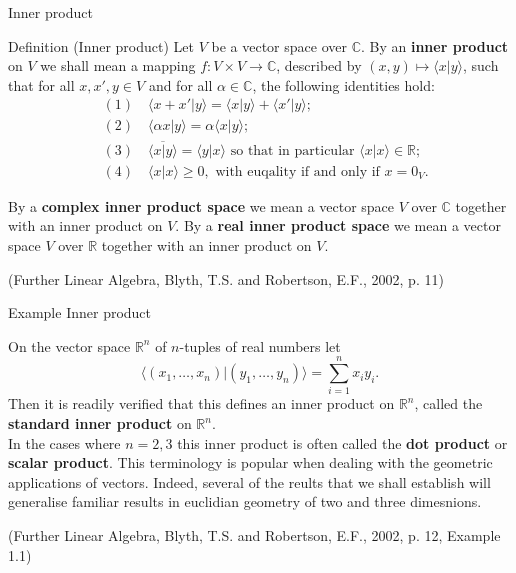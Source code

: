 \documentclass{beamer}
\begin{document}
\begin{frame}{Inner product}
    \small
    \begin{block}{Definition (Inner product)}
        Let $V$ be a vector space over $\mathbb{C}$. By an \textbf{inner product} on $V$ we shall mean a mapping $f: V \times V \to \mathbb{C}$, described by $(x,y) \mapsto \langle x | y \rangle$, such that for all $x, x', y \in V$ and for all $\alpha \in \mathbb{C}$, the following identities hold:
        \begin{align*}
            &(1) \quad \langle x + x' | y \rangle = \langle x | y \rangle + \langle x' | y \rangle;\\ 
            &(2) \quad \langle \alpha x | y \rangle = \alpha \langle x | y \rangle;\\
            &(3) \quad \overline{\langle x | y \rangle} = \langle y | x \rangle \text{ so that in particular } \langle x | x \rangle \in \mathbb{R};\\
            &(4) \quad \langle x | x \rangle \geq 0, \text{ with euqality if and only if } x = 0_V.
        \end{align*}
        
        By a \textbf{complex inner product space} we mean a vector space $V$ over $\mathbb{C}$ together with an inner product on $V$. By a \textbf{real inner product space} we mean a vector space $V$ over $\mathbb{R}$ together with an inner product on $V$.
        
        \par \vspace{3mm} (Further Linear Algebra, Blyth, T.S. and Robertson, E.F., 2002, p. 11)
    \end{block}
\end{frame}

\begin{frame}{Example Inner product}
    \small
    \begin{example}
        On the vector space $\mathbb{R}^n$ of $n$-tuples of real numbers let
        $$\langle (x_1, \dots, x_n) | (y_1, \dots, y_n) \rangle = \sum_{i=1}^{n}{x_i y_i}.$$
        Then it is readily verified that this defines an inner product on $\mathbb{R}^n$, called the \textbf{standard inner product} on $\mathbb{R}^n$.\\
        In the cases where $n = 2,3$ this inner product is often called the \textbf{dot product} or \textbf{scalar product}. This terminology is popular when dealing with the geometric applications of vectors. Indeed, several of the reults that we shall establish will generalise familiar results in euclidian geometry of two and three dimesnions.

        \par \vspace{3mm} (Further Linear Algebra, Blyth, T.S. and Robertson, E.F., 2002, p. 12, Example 1.1)
    \end{example}
\end{frame}
\end{document}
